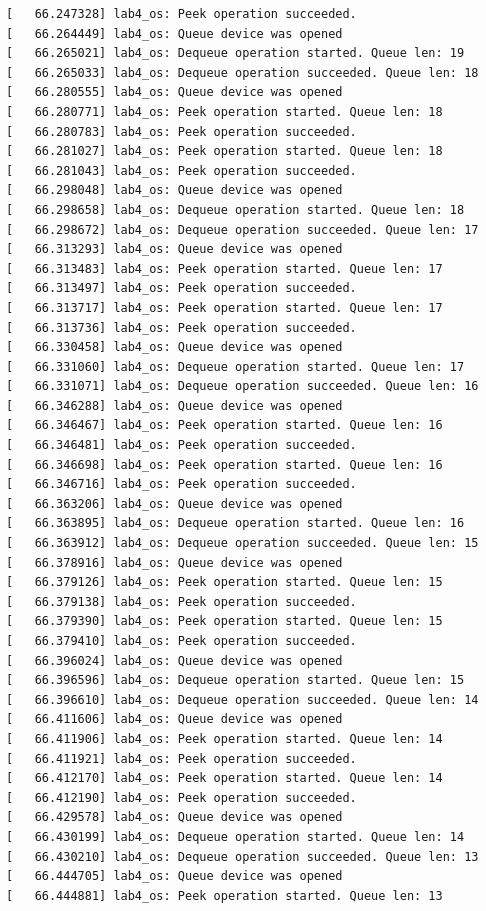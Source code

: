 \documentclass[a4paper,14pt]{extarticle}
\begin{document}
\begin{verbatim}
[   66.247328] lab4_os: Peek operation succeeded.
[   66.264449] lab4_os: Queue device was opened
[   66.265021] lab4_os: Dequeue operation started. Queue len: 19
[   66.265033] lab4_os: Dequeue operation succeeded. Queue len: 18
[   66.280555] lab4_os: Queue device was opened
[   66.280771] lab4_os: Peek operation started. Queue len: 18
[   66.280783] lab4_os: Peek operation succeeded.
[   66.281027] lab4_os: Peek operation started. Queue len: 18
[   66.281043] lab4_os: Peek operation succeeded.
[   66.298048] lab4_os: Queue device was opened
[   66.298658] lab4_os: Dequeue operation started. Queue len: 18
[   66.298672] lab4_os: Dequeue operation succeeded. Queue len: 17
[   66.313293] lab4_os: Queue device was opened
[   66.313483] lab4_os: Peek operation started. Queue len: 17
[   66.313497] lab4_os: Peek operation succeeded.
[   66.313717] lab4_os: Peek operation started. Queue len: 17
[   66.313736] lab4_os: Peek operation succeeded.
[   66.330458] lab4_os: Queue device was opened
[   66.331060] lab4_os: Dequeue operation started. Queue len: 17
[   66.331071] lab4_os: Dequeue operation succeeded. Queue len: 16
[   66.346288] lab4_os: Queue device was opened
[   66.346467] lab4_os: Peek operation started. Queue len: 16
[   66.346481] lab4_os: Peek operation succeeded.
[   66.346698] lab4_os: Peek operation started. Queue len: 16
[   66.346716] lab4_os: Peek operation succeeded.
[   66.363206] lab4_os: Queue device was opened
[   66.363895] lab4_os: Dequeue operation started. Queue len: 16
[   66.363912] lab4_os: Dequeue operation succeeded. Queue len: 15
[   66.378916] lab4_os: Queue device was opened
[   66.379126] lab4_os: Peek operation started. Queue len: 15
[   66.379138] lab4_os: Peek operation succeeded.
[   66.379390] lab4_os: Peek operation started. Queue len: 15
[   66.379410] lab4_os: Peek operation succeeded.
[   66.396024] lab4_os: Queue device was opened
[   66.396596] lab4_os: Dequeue operation started. Queue len: 15
[   66.396610] lab4_os: Dequeue operation succeeded. Queue len: 14
[   66.411606] lab4_os: Queue device was opened
[   66.411906] lab4_os: Peek operation started. Queue len: 14
[   66.411921] lab4_os: Peek operation succeeded.
[   66.412170] lab4_os: Peek operation started. Queue len: 14
[   66.412190] lab4_os: Peek operation succeeded.
[   66.429578] lab4_os: Queue device was opened
[   66.430199] lab4_os: Dequeue operation started. Queue len: 14
[   66.430210] lab4_os: Dequeue operation succeeded. Queue len: 13
[   66.444705] lab4_os: Queue device was opened
[   66.444881] lab4_os: Peek operation started. Queue len: 13

\end{verbatim}
\end{document}
